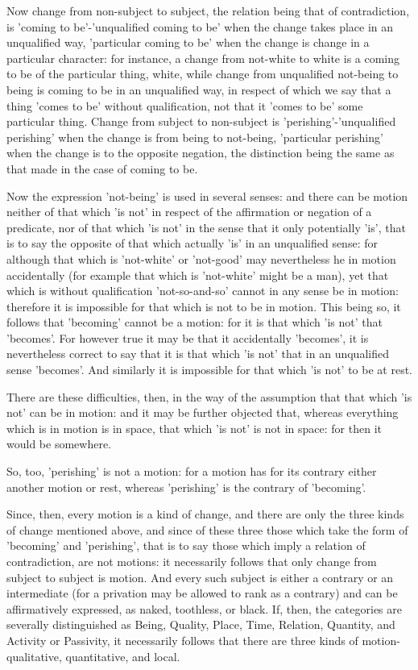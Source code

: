 Now change from non-subject to subject, the relation being that of
contradiction, is 'coming to be'-'unqualified coming to be' when the
change takes place in an unqualified way, 'particular coming to be'
when the change is change in a particular character: for instance,
a change from not-white to white is a coming to be of the particular
thing, white, while change from unqualified not-being to being is
coming to be in an unqualified way, in respect of which we say that
a thing 'comes to be' without qualification, not that it 'comes to
be' some particular thing. Change from subject to non-subject is 'perishing'-'unqualified
perishing' when the change is from being to not-being, 'particular
perishing' when the change is to the opposite negation, the distinction
being the same as that made in the case of coming to be.

Now the expression 'not-being' is used in several senses: and there
can be motion neither of that which 'is not' in respect of the affirmation
or negation of a predicate, nor of that which 'is not' in the sense
that it only potentially 'is', that is to say the opposite of that
which actually 'is' in an unqualified sense: for although that which
is 'not-white' or 'not-good' may nevertheless he in motion accidentally
(for example that which is 'not-white' might be a man), yet that which
is without qualification 'not-so-and-so' cannot in any sense be in
motion: therefore it is impossible for that which is not to be in
motion. This being so, it follows that 'becoming' cannot be a motion:
for it is that which 'is not' that 'becomes'. For however true it
may be that it accidentally 'becomes', it is nevertheless correct
to say that it is that which 'is not' that in an unqualified sense
'becomes'. And similarly it is impossible for that which 'is not'
to be at rest. 

There are these difficulties, then, in the way of the assumption that
that which 'is not' can be in motion: and it may be further objected
that, whereas everything which is in motion is in space, that which
'is not' is not in space: for then it would be somewhere.

So, too, 'perishing' is not a motion: for a motion has for its contrary
either another motion or rest, whereas 'perishing' is the contrary
of 'becoming'. 

Since, then, every motion is a kind of change, and there are only
the three kinds of change mentioned above, and since of these three
those which take the form of 'becoming' and 'perishing', that is to
say those which imply a relation of contradiction, are not motions:
it necessarily follows that only change from subject to subject is
motion. And every such subject is either a contrary or an intermediate
(for a privation may be allowed to rank as a contrary) and can be
affirmatively expressed, as naked, toothless, or black. If, then,
the categories are severally distinguished as Being, Quality, Place,
Time, Relation, Quantity, and Activity or Passivity, it necessarily
follows that there are three kinds of motion-qualitative, quantitative,
and local. 


